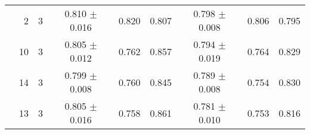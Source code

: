 \begin{tabular}{c|rr|ccc|ccc}
&   2 &      3 &     0.810 $\pm$          0.016 &    0.820 &     0.807 &    0.798 $\pm$           0.008 &     0.806 &      0.795 \\
&  10 &      3 &     0.805 $\pm$          0.012 &    0.762 &     0.857 &    0.794 $\pm$           0.019 &     0.764 &      0.829 \\
&  14 &      3 &     0.799 $\pm$          0.008 &    0.760 &     0.845 &    0.789 $\pm$           0.008 &     0.754 &      0.830 \\
&  13 &      3 &     0.805 $\pm$          0.016 &    0.758 &     0.861 &    0.781 $\pm$           0.010 &     0.753 &      0.816 \\
   \hline
 \end{tabular}


